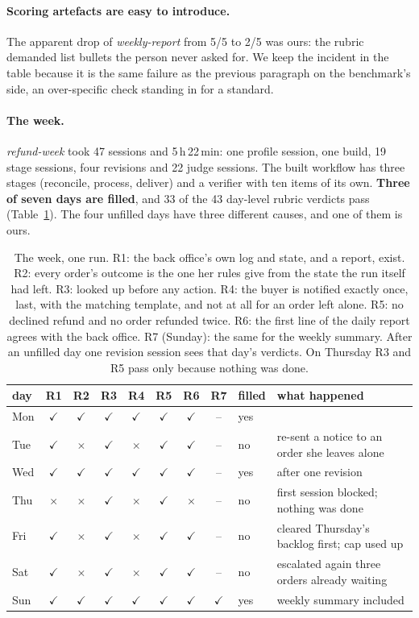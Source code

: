 \documentclass[10pt]{article}
\newcommand{\rpass}{$\checkmark$}
\newcommand{\rfail}{$\times$}
\begin{document}
\paragraph{Scoring artefacts are easy to introduce.} The apparent drop of \emph{weekly-report} from 5/5 to 2/5
was ours: the rubric demanded list bullets the person never asked for. We keep the incident in the table because
it is the same failure as the previous paragraph on the benchmark's side, an over-specific check standing in for
a standard.

\paragraph{The week.} \emph{refund-week} took 47 sessions and 5\,h\,22\,min: one profile session, one build,
19 stage sessions, four revisions and 22 judge sessions. The built workflow has three stages (reconcile, process,
deliver) and a verifier with ten items of its own. \textbf{Three of seven days are filled}, and 33 of the 43
day-level rubric verdicts pass (Table~\ref{tab:week}). The four unfilled days have three different causes, and
one of them is ours.

\begin{table}[h]
\centering\small\setlength{\tabcolsep}{4.5pt}
\begin{tabular}{@{}lcccccccll@{}}
\toprule
day & R1 & R2 & R3 & R4 & R5 & R6 & R7 & filled & what happened \\
\midrule
Mon & \rpass & \rpass & \rpass & \rpass & \rpass & \rpass & -- & yes & \\
Tue & \rpass & \rfail & \rpass & \rfail & \rpass & \rpass & -- & no & re-sent a notice to an order she leaves alone \\
Wed & \rpass & \rpass & \rpass & \rpass & \rpass & \rpass & -- & yes & after one revision \\
Thu & \rfail & \rfail & \rpass & \rfail & \rpass & \rfail & -- & no & first session blocked; nothing was done \\
Fri & \rpass & \rfail & \rpass & \rfail & \rpass & \rpass & -- & no & cleared Thursday's backlog first; cap used up \\
Sat & \rpass & \rfail & \rpass & \rfail & \rpass & \rpass & -- & no & escalated again three orders already waiting \\
Sun & \rpass & \rpass & \rpass & \rpass & \rpass & \rpass & \rpass & yes & weekly summary included \\
\bottomrule
\end{tabular}
\caption{The week, one run. R1: the back office's own log and state, and a report, exist. R2: every order's outcome
is the one her rules give from the state the run itself had left. R3: looked up before any action. R4: the buyer
is notified exactly once, last, with the matching template, and not at all for an order left alone. R5: no
declined refund and no order refunded twice. R6: the first line of the daily report agrees with the back office.
R7 (Sunday): the same for the weekly summary. After an unfilled day one revision session sees that day's verdicts.
On Thursday R3 and R5 pass only because nothing was done.}
\label{tab:week}
\end{table}
\end{document}
